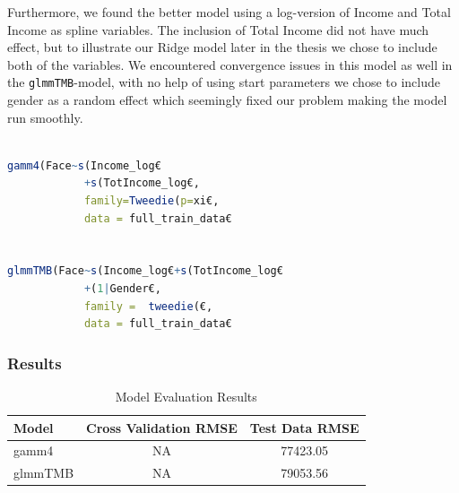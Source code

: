 \documentclass[12pt, twoside,hidelinks]{article}
\theoremstyle{definition}
\numberwithin{equation}{section}
\begin{document}
Furthermore, we found the better model using a log-version of Income and Total Income as spline variables. The inclusion of Total Income did not have much effect, but to illustrate our Ridge model later in the thesis we chose to include both of the variables. We encountered convergence issues in this model as well in the \texttt{glmmTMB}-model, with no help of using start parameters we chose to include gender as a random effect which seemingly fixed our problem making the model run smoothly.


\begin{lstlisting}[language=R]

gamm4(Face~s(Income_log€
            +s(TotIncome_log€,
            family=Tweedie(p=xi€, 
            data = full_train_data€
                         

glmmTMB(Face~s(Income_log€+s(TotIncome_log€
            +(1|Gender€,
            family =  tweedie(€, 
            data = full_train_data€

\end{lstlisting}

\subsubsection{Results}

\begin{table}[H]
\centering
\caption{Model Evaluation Results}
\label{table:model_evaluationmort}
\begin{tabular}{lcc}
\hline
\textbf{Model} & \textbf{Cross Validation RMSE} & \textbf{Test Data RMSE} \\
\hline
gamm4 & NA  & 77423.05 \\
glmmTMB & NA &  79053.56 \\
\hline
\end{tabular}
\end{table}
\end{document}
